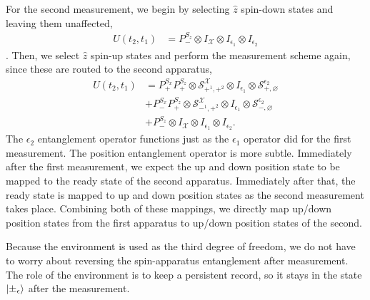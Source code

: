 For the second measurement, we begin by selecting $\hat{z}$ spin-down states and leaving them unaffected,
\begin{align}
  U(t_2, t_1) &=  P^{S_z}_- \otimes I_\mathcal{X} \otimes I_{\epsilon_1} \otimes I_{\epsilon_2}
\end{align}.
Then, we select $\hat{z}$ spin-up states and perform the measurement scheme again, since these are routed to the second apparatus,
\begin{align}
  U(t_2, t_1) &= P^{S_x}_+ P^{S_z}_+ \otimes \mathcal{S}^\mathcal{X}_{+^1, +^2} \otimes I_{\epsilon_1} \otimes \mathcal{S}^{\epsilon_2}_{+, \varnothing} \\ \nonumber
  &+ P^{S_x}_- P^{S_z}_+ \otimes \mathcal{S}^\mathcal{X}_{-^1, +^2} \otimes I_{\epsilon_1} \otimes \mathcal{S}^{\epsilon_2}_{-, \varnothing} \\ \nonumber
  &+ P^{S_z}_- \otimes I_\mathcal{X} \otimes I_{\epsilon_1} \otimes I_{\epsilon_2}.
\end{align}
The $\epsilon_2$ entanglement operator functions just as the $\epsilon_1$ operator did for the first measurement. The position entanglement operator is more subtle. Immediately after the first measurement, we expect the up and down position state to be mapped to the ready state of the second apparatus. Immediately after that, the ready state is mapped to up and down position states as the second measurement takes place. Combining both of these mappings, we directly map up/down position states from the first apparatus to up/down position states of the second.

Because the environment is used as the third degree of freedom, we do not have to worry about reversing the spin-apparatus entanglement after measurement. The role of the environment is to keep a persistent record, so it stays in the state $\ket{\pm_\epsilon}$ after the measurement.

